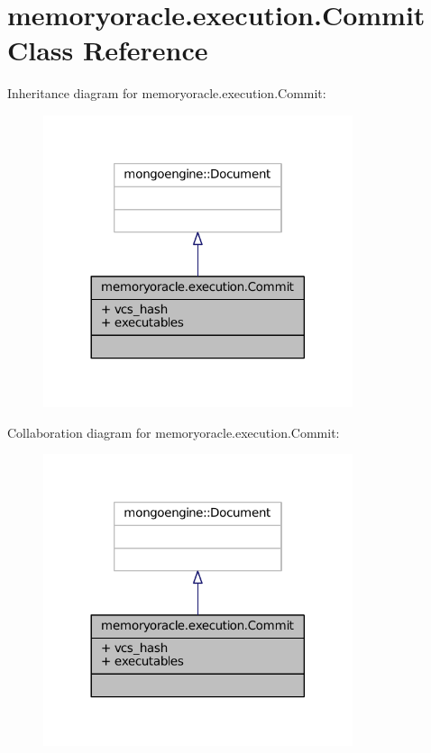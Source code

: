 \hypertarget{classmemoryoracle_1_1execution_1_1Commit}{}\section{memoryoracle.\+execution.\+Commit Class Reference}
\label{classmemoryoracle_1_1execution_1_1Commit}


Inheritance diagram for memoryoracle.\+execution.\+Commit\+:\nopagebreak
\begin{figure}[H]
\begin{center}
\leavevmode
\includegraphics[width=257pt]{classmemoryoracle_1_1execution_1_1Commit__inherit__graph}
\end{center}
\end{figure}


Collaboration diagram for memoryoracle.\+execution.\+Commit\+:\nopagebreak
\begin{figure}[H]
\begin{center}
\leavevmode
\includegraphics[width=257pt]{classmemoryoracle_1_1execution_1_1Commit__coll__graph}
\end{center}
\end{figure}
